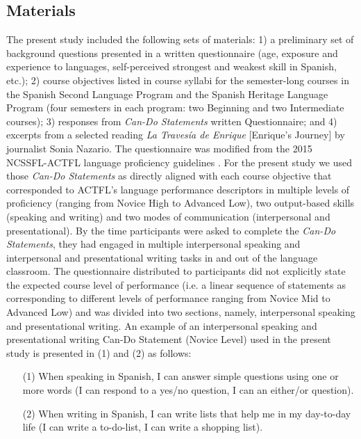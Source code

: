 \documentclass[output=paper]{langscibook}
\begin{document}
\subsection{Materials}
The present study included the following sets of materials: 1) a preliminary set of background questions presented in a written questionnaire (age, exposure and experience to languages, self-perceived strongest and weakest skill in Spanish, etc.); 2) course objectives listed in course syllabi for the semester-long courses in the Spanish Second Language Program and the Spanish Heritage Language Program (four semesters in each program: two Beginning and two Intermediate courses); 3) responses from \textit{Can-Do Statements} written Questionnaire; and 4) excerpts from a selected reading \textit{La Travesía de Enrique} [Enrique’s Journey] by journalist Sonia Nazario. The questionnaire was modified from the 2015 NCSSFL-ACTFL language proficiency guidelines \citep{MoellerYu2015}. For the present study we used those \textit{Can-Do Statements} as directly aligned with each course objective that corresponded to ACTFL’s language performance descriptors in multiple levels of proficiency (ranging from Novice High to Advanced Low), two output-based skills (speaking and writing) and two modes of communication (interpersonal and presentational). By the time participants were asked to complete the \textit{Can-Do Statements}, they had engaged in multiple interpersonal speaking and interpersonal and presentational writing tasks in and out of the language classroom. The questionnaire distributed to participants did not explicitly state the expected course level of performance (i.e. a linear sequence of statements as corresponding to different levels of performance ranging from Novice Mid to Advanced Low) and was divided into two sections, namely, interpersonal speaking and presentational writing. An example of an interpersonal speaking and presentational writing Can-Do Statement (Novice Level) used in the present study is presented in (1) and (2) as follows:

\begin{itemize}
  \item[(1)] When speaking in Spanish, I can answer simple questions using one or more words (I can respond to a yes/no question, I can an either/or question).
  \item[(2)] When writing in Spanish, I can write lists that help me in my day-to-day life (I can write a to-do-list, I can write a shopping list).
\end{itemize}
\end{document}
